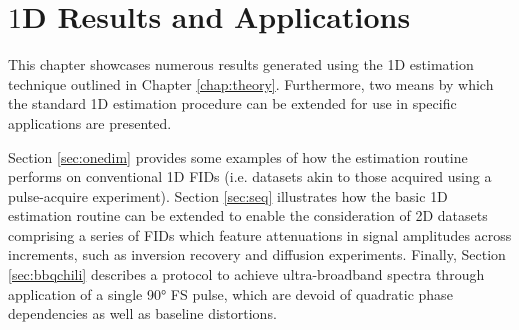 \chapter{$1$D Results and Applications}
\label{chap:results}

This chapter showcases numerous results generated using the \ac{1D} estimation
technique outlined in Chapter \ref{chap:theory}. Furthermore, two means by
which the standard \ac{1D} estimation procedure can be extended for use in
specific applications are presented.

Section \ref{sec:onedim} provides some examples of how the estimation routine
performs on conventional \ac{1D} \acp{FID} (i.e. datasets akin to those
acquired using a pulse-acquire experiment). Section \ref{sec:seq} illustrates
how the basic \ac{1D} estimation routine can be extended to enable the
consideration of \ac{2D} datasets comprising a series of \acp{FID} which
feature attenuations in signal amplitudes across increments, such as inversion
recovery and diffusion experiments.  Finally, Section \ref{sec:bbqchili}
describes a protocol to achieve ultra-broadband spectra through application of
a single \ang{90} \acl{FS} pulse, which are devoid of quadratic phase
dependencies as well as baseline distortions.




